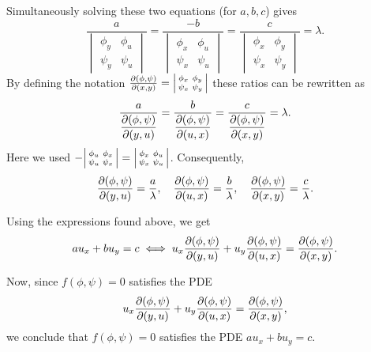 \documentclass[11pt]{penrose}
\begin{document}
\begin{problem}{4}
    Simultaneously solving these two equations (for $a, b, c$) gives
    \begin{equation*}
        \frac{a}{\begin{vmatrix} \phi_y & \phi_u \\ \psi_y & \psi_u \end{vmatrix}}
        = \frac{-b}{\begin{vmatrix} \phi_x & \phi_u \\ \psi_x & \psi_u \end{vmatrix}}
        = \frac{c}{\begin{vmatrix} \phi_x & \phi_y \\ \psi_x & \psi_y \end{vmatrix}}
        = \lambda.
    \end{equation*}
    By defining the notation $\frac{\pd(\phi,\psi)}{\pd(x,y)} = \begin{vsmallmatrix*} \phi_x & \phi_y \\ \psi_x & \psi_y \end{vsmallmatrix*}$ these ratios can be rewritten as
    \begin{equation*}
        \frac{a}{\displaystyle\frac{\partial(\phi,\psi)}{\partial(y,u)}}
        = \frac{b}{\displaystyle\frac{\partial(\phi,\psi)}{\partial(u,x)}}
        = \frac{c}{\displaystyle\frac{\partial(\phi,\psi)}{\partial(x,y)}}
        = \lambda.
    \end{equation*}
    Here we used $-\begin{vsmallmatrix*} \phi_u & \phi_x \\ \psi_u & \psi_x \end{vsmallmatrix*} = \begin{vsmallmatrix*} \phi_x & \phi_u \\ \psi_x & \psi_u \end{vsmallmatrix*}$. Consequently,
    \begin{equation*}
        \frac{\partial(\phi, \psi)}{\partial(y,u)} = \frac{a}{\lambda}, \quad
        \frac{\partial(\phi, \psi)}{\partial(u,x)} = \frac{b}{\lambda}, \quad
        \frac{\partial(\phi, \psi)}{\partial(x,y)} = \frac{c}{\lambda}.
    \end{equation*}

    Using the expressions found above, we get
    \begin{equation*}
        a u_x + b u_y = c
        \iff
        u_x \frac{\partial(\phi, \psi)}{\partial(y,u)}
        + u_y \frac{\partial(\phi, \psi)}{\partial(u,x)}
        = \frac{\partial(\phi, \psi)}{\partial(x,y)}.
    \end{equation*}

    Now, since $f(\phi, \psi) = 0$ satisfies the PDE
    \begin{equation*}
        u_x \frac{\partial(\phi, \psi)}{\partial(y,u)}
        + u_y \frac{\partial(\phi, \psi)}{\partial(u,x)}
        = \frac{\partial(\phi, \psi)}{\partial(x,y)},
    \end{equation*}
    we conclude that $f(\phi,\psi) = 0$ satisfies the PDE $au_x + bu_y = c$.
\end{problem}
\end{document}
